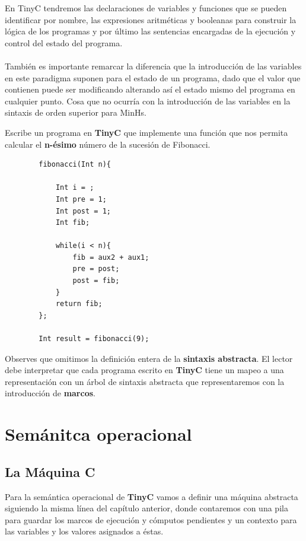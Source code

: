 \bigskip


En \textsf{TinyC} tendremos las declaraciones de variables y funciones que se pueden identificar por nombre, las expresiones aritméticas y booleanas para construir la lógica de los programas y por último las sentencias encargadas de la ejecución y control del estado del programa.\\\\
También es importante remarcar la diferencia que la introducción de las variables en este paradigma suponen para el estado de un programa, dado que el valor que contienen puede ser modificando alterando así el estado mismo del programa en cualquier punto.  Cosa que no ocurría con la introducción de las variables en la sintaxis de orden superior para \textsf{MinHs}.

\bigskip

\begin{exercise}
    Escribe un programa en \textbf{TinyC} que implemente una función que nos permita calcular el \textbf{n-ésimo} número de la sucesión de Fibonacci.\\
    \begin{lstlisting}
        fibonacci(Int n){
        
            Int i = ;
            Int pre = 1;
            Int post = 1;
            Int fib;
            
            while(i < n){
                fib = aux2 + aux1;
                pre = post;
                post = fib;
            }
            return fib;
        };

        Int result = fibonacci(9);
    \end{lstlisting}
\end{exercise}


        Observes que omitimos la definición entera de la \textbf{sintaxis abstracta}. El lector debe interpretar que cada programa escrito en \textbf{TinyC} tiene un mapeo a una representación con un árbol de sintaxis abstracta que representaremos con la introducción de \textbf{marcos}.


\section{Semánitca operacional}

\subsection{La Máquina C}
Para la semántica operacional de \textbf{TinyC} vamos a definir una máquina abstracta siguiendo la misma línea del capítulo anterior, donde contaremos con una pila para guardar los marcos de ejecución y cómputos pendientes y un contexto para las variables y los valores asignados a éstas.

